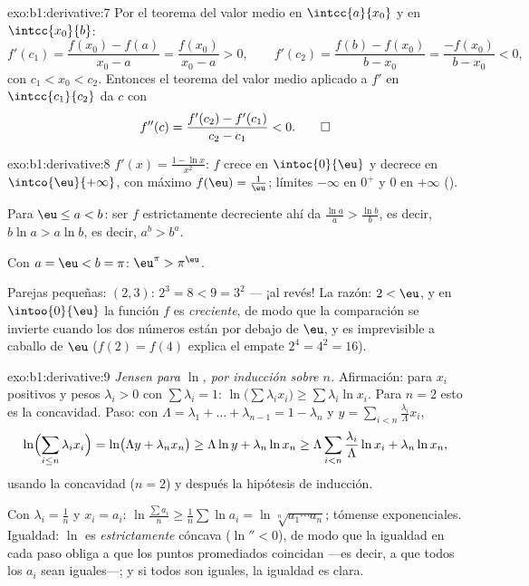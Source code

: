 \begin{solution}{exo:b1:derivative:7}
Por el teorema del valor medio en $\intcc{a}{x_0}$ y en
$\intcc{x_0}{b}$:
\[
f'(c_1) = \frac{f(x_0) - f(a)}{x_0 - a} = \frac{f(x_0)}{x_0 - a} > 0,
\qquad
f'(c_2) = \frac{f(b) - f(x_0)}{b - x_0} = \frac{-f(x_0)}{b - x_0} < 0,
\]
con $c_1 < x_0 < c_2$. Entonces el teorema del valor medio aplicado a
$f'$ en $\intcc{c_1}{c_2}$ da $c$ con
\[
f''(c) = \frac{f'(c_2) - f'(c_1)}{c_2 - c_1} < 0 . \qedhere
\]
\end{solution}

\begin{solution}{exo:b1:derivative:8}
$f'(x) = \frac{1 - \ln x}{x^2}$: $f$ crece en $\intoc{0}{\eu}$ y
decrece en $\intco{\eu}{+\infty}$, con máximo
$f(\eu) = \frac1\eu$; límites $-\infty$ en $0^+$ y $0$ en $+\infty$
().

Para $\eu \leq a < b$: ser $f$ estrictamente decreciente ahí da
$\frac{\ln a}{a} > \frac{\ln b}{b}$, es decir, $b \ln a > a \ln b$,
es decir, $a^b > b^a$.

Con $a = \eu < b = \pi$: $\eu^\pi > \pi^\eu$.

Parejas pequeñas: $(2, 3)$: $2^3 = 8 < 9 = 3^2$ --- ¡al revés! La
razón: $2 < \eu$, y en $\intoo{0}{\eu}$ la función $f$ es
\emph{creciente}, de modo que la comparación se invierte cuando los
dos números están por debajo de $\eu$, y es imprevisible a caballo de
$\eu$ ($f(2) = f(4)$ explica el empate $2^4 = 4^2 = 16$).
\end{solution}

\begin{solution}{exo:b1:derivative:9}
\emph{Jensen para $\ln$, por inducción sobre $n$.} Afirmación: para
$x_i$ positivos y pesos $\lambda_i > 0$ con $\sum \lambda_i = 1$:
$\ln\bigl(\sum \lambda_i x_i\bigr) \geq \sum \lambda_i \ln x_i$. Para
$n = 2$ esto es la concavidad. Paso: con
$\Lambda = \lambda_1 + \dots + \lambda_{n-1} = 1 - \lambda_n$ y
$y = \sum_{i<n} \frac{\lambda_i}{\Lambda} x_i$,
\[
\ln\Bigl(\sum_{i \leq n} \lambda_i x_i\Bigr)
= \ln\bigl(\Lambda y + \lambda_n x_n\bigr)
\geq \Lambda \ln y + \lambda_n \ln x_n
\geq \Lambda \sum_{i<n} \frac{\lambda_i}{\Lambda}\ln x_i
+ \lambda_n \ln x_n,
\]
usando la concavidad ($n = 2$) y después la hipótesis de inducción.

Con $\lambda_i = \frac 1n$ y $x_i = a_i$:
$\ln\frac{\sum a_i}{n} \geq \frac 1n \sum \ln a_i =
\ln\sqrt[n]{a_1\cdots a_n}$; tómense exponenciales. Igualdad: $\ln$
es \emph{estrictamente} cóncava ($\ln'' < 0$), de modo que la
igualdad en cada paso obliga a que los puntos promediados coincidan
---es decir, a que todos los $a_i$ sean iguales---; y si todos son
iguales, la igualdad es clara.
\end{solution}

